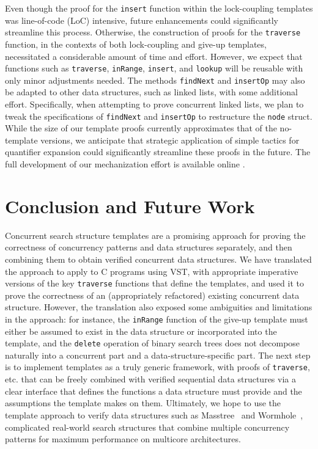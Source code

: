 \documentclass[a4paper,UKenglish,cleveref, autoref, thm-restate]{lipics-v2021}
\newcommand{\wm}[1]{\textbf{\textcolor{violet}{[William: #1]}}}
\begin{document}
Even though the proof for the \texttt{insert} function within the lock-coupling templates was line-of-code (LoC) intensive, future enhancements could significantly streamline this process. Otherwise, the construction of proofs for the \texttt{traverse} function, in the contexts of both lock-coupling and give-up templates, necessitated a considerable amount of time and effort.
However, we expect that functions such as \texttt{traverse}, \texttt{inRange}, \texttt{insert}, and \texttt{lookup} will be reusable with only minor adjustments needed.  The methods \texttt{findNext} and \texttt{insertOp} may also be adapted to other data structures, such as linked lists, with some additional effort. 
Specifically, when attempting to prove concurrent linked lists, we plan to tweak the specifications of \texttt{findNext} and \texttt{insertOp} to restructure the \texttt{node} struct. While the size of our template proofs currently approximates that of the no-template versions, we anticipate that strategic application of simple tactics for quantifier expansion could significantly streamline these proofs in the future. The full development of our mechanization effort is available online
\href{https://github.com/PrincetonUniversity/DeepSpecDB/tree/master/concurrency/templates}{\color{blue}{https://github.com/PrincetonUniversity/DeepSpecDB/tree/master/concurrency/templates}}.

\section{Conclusion and Future Work}
Concurrent search structure templates are a promising approach for proving the correctness of concurrency patterns and data structures separately, and then combining them to obtain verified concurrent data structures. We have translated the approach to apply to C programs using VST, with appropriate imperative versions of the key \lstinline{traverse} functions that define the templates, and used it to prove the correctness of an (appropriately refactored) existing concurrent data structure. However, the translation also exposed some ambiguities and limitations in the approach: for instance, the \lstinline{inRange} function of the give-up template must either be assumed to exist in the data structure or incorporated into the template, and the \lstinline{delete} operation of binary search trees does not decompose naturally into a concurrent part and a data-structure-specific part.  %
The next step is to implement templates as a truly generic framework, with proofs of \lstinline{traverse}, etc. that can be freely combined with verified sequential data structures via a clear interface that defines the functions a data structure must provide and the assumptions the template makes on them.
Ultimately, we hope to use the template approach to verify data structures such as Masstree~\cite{masstree} and Wormhole~\cite{wormhole}, complicated real-world search structures that combine multiple concurrency patterns for maximum performance on multicore architectures.
\end{document}
